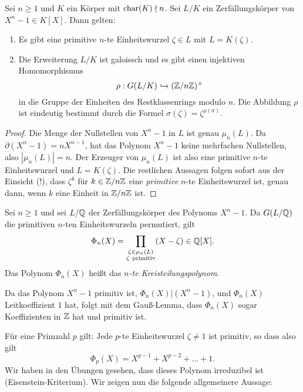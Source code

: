\documentclass{book}
\begin{document}
\begin{prop}
    \label{prop:galoisew}
    Sei $n \ge 1$ und $K$ ein Körper mit $\operatorname{char}(K) \nmid n$. Sei $L/K$ ein Zerfällungskörper von $X^n -1 \in K[X]$. Dann gelten:
    \begin{enumerate}
        \item Es gibt eine primitive $n$-te Einheitswurzel $\zeta \in L$ mit $L = K(\zeta)$. 
        \item Die Erweiterung $L/K$ ist galoissch und es gibt einen injektiven Homomorphismus
            \[
                \rho: G(L/K) \hookrightarrow (\mathbb{Z}/n\mathbb{Z})^{\times}
            \]
            in die Gruppe der Einheiten des Restklassenrings modulo $n$. Die
            Abbildung $\rho$ ist eindeutig bestimmt durch die Formel
            $\sigma(\zeta) = \zeta^{\rho(\sigma)}$. 
    \end{enumerate}
\end{prop}
\begin{proof}
    Die Menge der Nullstellen von $X^n-1$ in $L$ ist genau $\mu_n(L)$. Da
    $\partial(X^n - 1) = nX^{n-1}$, hat das Polynom $X^n - 1$ keine mehrfachen
    Nullstellen, also $|\mu_n(L)| = n$. Der Erzeuger von $\mu_n(L)$ ist also
    eine primitive $n$-te Einheitswurzel und $L = K(\zeta)$. Die restlichen
    Aussagen folgen sofort aus der Einsicht (!), dass $\zeta^k$ für $k \in
    \mathbb{Z}/n\mathbb{Z}$ eine {\em primitive} $n$-te Einheitswurzel ist, genau dann, wenn
    $k$ eine Einheit in $\mathbb{Z}/n\mathbb{Z}$ ist. 
\end{proof}

Sei $n \ge 1$ und sei $L/\mathbb{Q}$ der Zerfällungskörper des Polynoms $X^n -1$. Da $G(L/\mathbb{Q})$ die
primitiven $n$-ten Einheitswurzeln permutiert, gilt
\[
	\Phi_n(X) = \prod_{\substack{\zeta \in \mu_n(L) \\ \zeta \ \text{primitiv}}} (X- \zeta) \in
	\mathbb{Q}[X].
\]
Das Polynom $\Phi_n(X)$ heißt das {\em $n$-te Kreisteilungspolynom}. 

\begin{rem} Da das Polynom $X^n -1$ primitiv ist, $\Phi_n(X)|(X^n-1)$, und $\Phi_n(X)$ Leitkoeffizient
	$1$ hat, folgt mit dem Gauß-Lemma, dass $\Phi_n(X)$ sogar Koeffizienten in $\mathbb{Z}$ hat und
	primitiv ist. 
\end{rem}

Für eine Primzahl $p$ gilt: Jede $p$-te Einheitswurzel $\zeta \ne 1$ ist primitiv, so dass also gilt
\[
	\Phi_p(X) = X^{p-1} + X^{p-2} + \dots + 1.
\]
Wir haben in den Übungen gesehen, dass dieses Polynom irreduzibel ist (Eisenstein-Kriterium). Wir
zeigen nun die folgende allgemeinere Aussage: 
\end{document}
